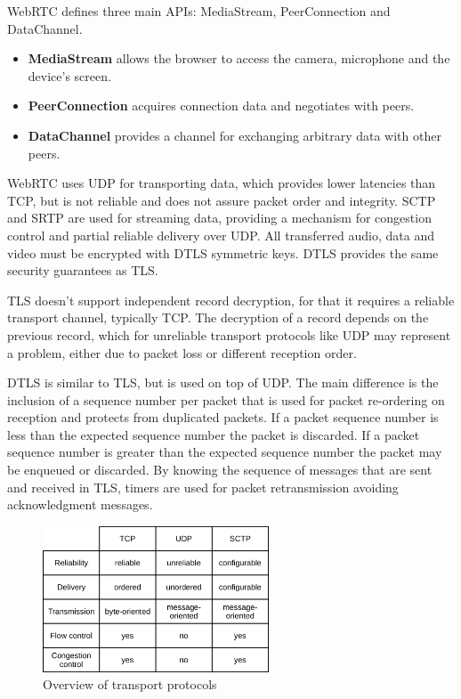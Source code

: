 \ac{WebRTC} defines three main \ac{API}s: MediaStream, PeerConnection and DataChannel. 

\begin{itemize}
  \item \textbf{MediaStream} allows the browser to access the camera, microphone and the device's screen. 

  \item \textbf{PeerConnection} acquires connection data and negotiates with peers.
  \item \textbf{DataChannel} provides a channel for exchanging arbitrary data with other peers.
\end{itemize}

\ac{WebRTC} uses \ac{UDP} for transporting data, which provides lower latencies than \ac{TCP}, but is not reliable and does not assure packet order and integrity. \ac{SCTP} and \ac{SRTP} are used for streaming data, providing a mechanism for congestion control and partial reliable delivery over \ac{UDP}. All transferred audio, data and video must be encrypted with \ac{DTLS} symmetric keys. \ac{DTLS} provides the same security guarantees as \ac{TLS}. 

\ac{TLS} doesn't support independent record decryption, for that it requires a reliable transport channel, typically \ac{TCP}. The decryption of a record depends on the previous record, which for unreliable transport protocols like \ac{UDP} may represent a problem, either due to packet loss or different reception order.

\ac{DTLS} is similar to \ac{TLS}, but is used on top of \ac{UDP}.
The main difference is the inclusion of a sequence number per packet that is used for packet re-ordering on reception and protects from duplicated packets. If a packet sequence number is less than the expected sequence number the packet is discarded. If a packet sequence number is greater than the expected sequence number the packet may be enqueued or discarded. By knowing the sequence of messages that are sent and received in \ac{TLS}, timers are used for packet retransmission avoiding acknowledgment messages.

\begin{figure}[H]
	\centering
	\includegraphics[width=0.6\textwidth]{figures/basic_protocols.png}
	\caption{Overview of transport protocols}
\end{figure}

